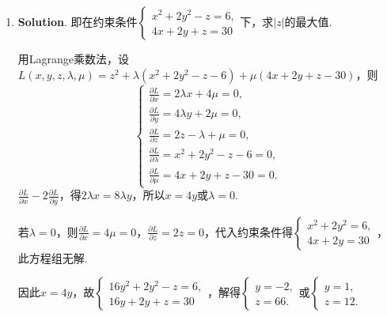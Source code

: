 \documentclass[../main.tex]{subfiles}
\begin{document}
\begin{enumerate}
          则$\nabla F = (2x,2y,1)$. 令$\nabla F // (1,1,1)$，得$x=y=\frac{1}{2}$，

          代入方程可得$z=\frac{1}{2}$，所以切平面方程为$x-\frac{1}{2}+y-\frac{1}{2}+z
              -\frac{1}{2}=0$，即$2x + 2y + 2z = 3$.

    \item \textbf{Solution}. 即在约束条件$\begin{cases}
                  x^{2}+2y^{2}-z=6, \\
                  4x+2y+z=30
              \end{cases}$下，求$|z|$的最大值.

          用Lagrange乘数法，设$L(x,y,z,\lambda,\mu) = z^{2} + \lambda(x^{2}+2y^{2}-z-
              6) + \mu(4x+2y+z-30)$，则
          \[
              \begin{cases}
                  \frac{\partial L}{\partial x}= 2\lambda x + 4\mu = 0,        \\[6pt]
                  \frac{\partial L}{\partial y}= 4\lambda y + 2\mu = 0,        \\[6pt]
                  \frac{\partial L}{\partial z}= 2z - \lambda + \mu = 0,       \\[6pt]
                  \frac{\partial L}{\partial \lambda}= x^{2}+2y^{2}-z - 6 = 0, \\[6pt]
                  \frac{\partial L}{\partial \mu}= 4x+2y+z-30 = 0.
              \end{cases}
          \]
          $\frac{\partial L}{\partial x}-2\frac{\partial L}{\partial y}$，得$2\lambda
              x = 8\lambda y$，所以$x=4y$或$\lambda=0$.

          若$\lambda=0$，则$\frac{\partial L}{\partial x}= 4\mu = 0$，$\frac{\partial
                  L}{\partial z}= 2z = 0$，代入约束条件得$\begin{cases}
                  x^{2}+2y^{2}=6, \\
                  4x+2y=30
              \end{cases}$，此方程组无解.

          因此$x=4y$，故$\begin{cases}
                  16y^{2}+2y^{2}-z=6, \\
                  16y+2y+z=30
              \end{cases}$，解得$\begin{cases}
                  y=-2, \\
                  z=66.
              \end{cases}$或$\begin{cases}
                  y=1, \\
                  z=12.
              \end{cases}$


\end{enumerate}
\end{document}
